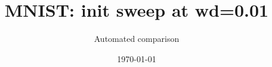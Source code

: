 \documentclass[aspectratio=169]{beamer}
\title{MNIST: init sweep at wd=0.01}
\author{Automated comparison}
\date{\today}
\begin{document}
\begin{frame}
    \titlepage
\end{frame}

\end{document}
